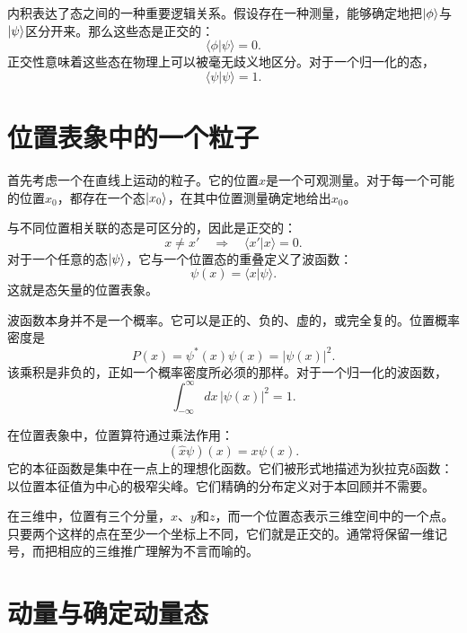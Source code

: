 内积表达了态之间的一种重要逻辑关系。假设存在一种测量，能够确定地把\(\left\lvert\phi\right\rangle\)与\(\left\lvert\psi\right\rangle\)区分开来。那么这些态是正交的：
\begin{equation}
\langle\phi|\psi\rangle=0.
\end{equation}
正交性意味着这些态在物理上可以被毫无歧义地区分。对于一个归一化的态，
\begin{equation}
\langle\psi|\psi\rangle=1.
\end{equation}

\section{位置表象中的一个粒子}

首先考虑一个在直线上运动的粒子。它的位置\(x\)是一个可观测量。对于每一个可能的位置\(x_0\)，都存在一个态\(\left\lvert x_0\right\rangle\)，在其中位置测量确定地给出\(x_0\)。

与不同位置相关联的态是可区分的，因此是正交的：
\begin{equation}
x\neq x'
\quad\Longrightarrow\quad
\langle x'|x\rangle=0.
\end{equation}
对于一个任意的态\(\left\lvert\psi\right\rangle\)，它与一个位置态的重叠定义了波函数：
\begin{equation}
\psi(x)=\langle x|\psi\rangle.
\end{equation}
这就是态矢量的位置表象。

波函数本身并不是一个概率。它可以是正的、负的、虚的，或完全复的。位置概率密度是
\begin{equation}
P(x)=\psi^*(x)\psi(x)=|\psi(x)|^2.
\end{equation}
该乘积是非负的，正如一个概率密度所必须的那样。对于一个归一化的波函数，
\begin{equation}
\int_{-\infty}^{\infty}dx\,|\psi(x)|^2=1.
\end{equation}

在位置表象中，位置算符通过乘法作用：
\begin{equation}
(\hat x\psi)(x)=x\psi(x).
\end{equation}
它的本征函数是集中在一点上的理想化函数。它们被形式地描述为狄拉克{\proseunicodefont δ}函数：以位置本征值为中心的极窄尖峰。它们精确的分布定义对于本回顾并不需要。

在三维中，位置有三个分量，\(x\)、\(y\)和\(z\)，而一个位置态表示三维空间中的一个点。只要两个这样的点在至少一个坐标上不同，它们就是正交的。通常将保留一维记号，而把相应的三维推广理解为不言而喻的。

\section{动量与确定动量态}

